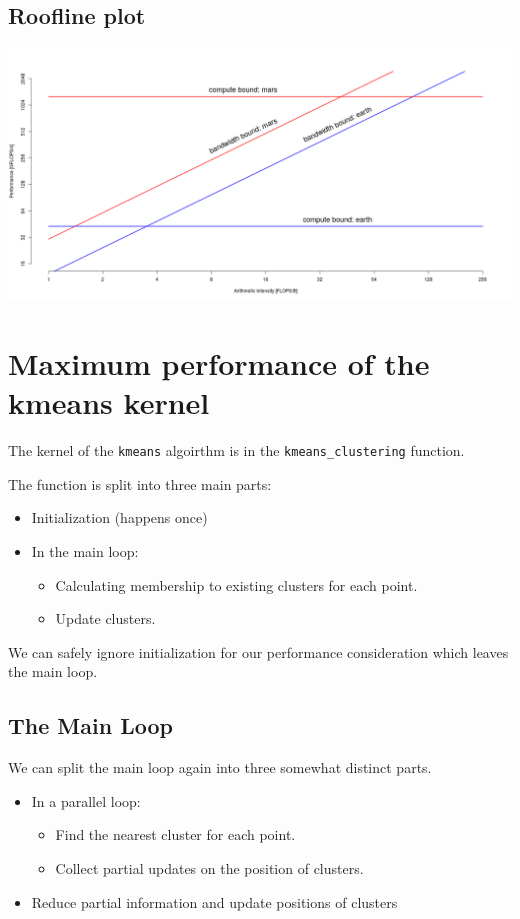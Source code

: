 \documentclass[]{article}
\begin{document}
\newpage

\subsection{Roofline plot} 
\includegraphics[scale=0.4, angle=90]{roofline-earth-mars-pure.png}

\newpage

\section{Maximum performance of the kmeans kernel}

The kernel of the \texttt{kmeans} algoirthm is in the \texttt{kmeans\_clustering} function.

The function is split into three main parts:
\begin{itemize}
	\item Initialization (happens once)
	\item In the main loop:
	\begin{itemize}
		\item Calculating membership to existing clusters for each point.
		\item Update clusters.
	\end{itemize}
\end{itemize}

We can safely ignore initialization for our performance consideration which leaves the main loop.

\newpage
\subsection{The Main Loop}

We can split the main loop again into three somewhat distinct parts.
\begin{itemize}
	\item In a parallel loop:
\begin{itemize}
	\item Find the nearest cluster for each point.
	\item Collect partial updates on the position of clusters.
\end{itemize}
	\item Reduce partial information and update positions of clusters 	
\end{itemize}
\end{document}
